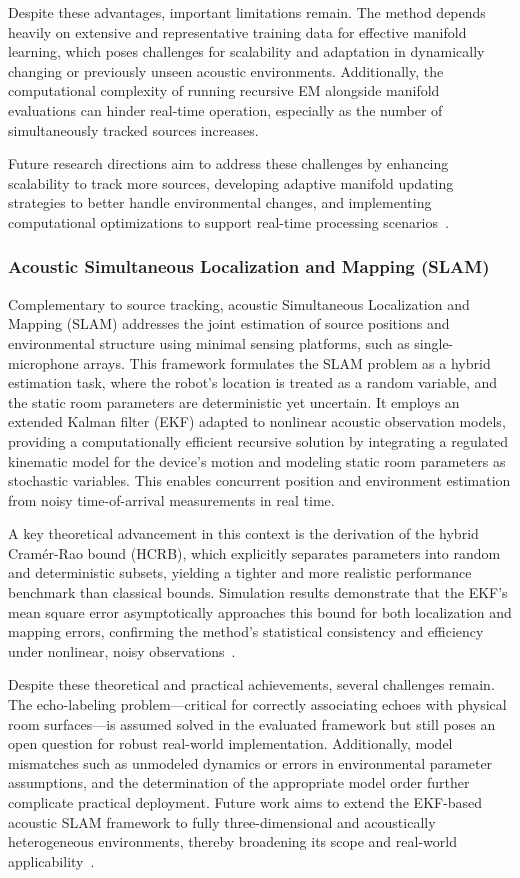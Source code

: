 \documentclass[sigconf]{acmart}
\begin{document}
Despite these advantages, important limitations remain. The method depends heavily on extensive and representative training data for effective manifold learning, which poses challenges for scalability and adaptation in dynamically changing or previously unseen acoustic environments. Additionally, the computational complexity of running recursive EM alongside manifold evaluations can hinder real-time operation, especially as the number of simultaneously tracked sources increases.

Future research directions aim to address these challenges by enhancing scalability to track more sources, developing adaptive manifold updating strategies to better handle environmental changes, and implementing computational optimizations to support real-time processing scenarios~\cite{ref38}.

\subsubsection{Acoustic Simultaneous Localization and Mapping (SLAM)}

Complementary to source tracking, acoustic Simultaneous Localization and Mapping (SLAM) addresses the joint estimation of source positions and environmental structure using minimal sensing platforms, such as single-microphone arrays. This framework formulates the SLAM problem as a hybrid estimation task, where the robot's location is treated as a random variable, and the static room parameters are deterministic yet uncertain. It employs an extended Kalman filter (EKF) adapted to nonlinear acoustic observation models, providing a computationally efficient recursive solution by integrating a regulated kinematic model for the device’s motion and modeling static room parameters as stochastic variables. This enables concurrent position and environment estimation from noisy time-of-arrival measurements in real time.

A key theoretical advancement in this context is the derivation of the hybrid Cramér-Rao bound (HCRB), which explicitly separates parameters into random and deterministic subsets, yielding a tighter and more realistic performance benchmark than classical bounds. Simulation results demonstrate that the EKF's mean square error asymptotically approaches this bound for both localization and mapping errors, confirming the method’s statistical consistency and efficiency under nonlinear, noisy observations~\cite{ref39}.

Despite these theoretical and practical achievements, several challenges remain. The echo-labeling problem—critical for correctly associating echoes with physical room surfaces—is assumed solved in the evaluated framework but still poses an open question for robust real-world implementation. Additionally, model mismatches such as unmodeled dynamics or errors in environmental parameter assumptions, and the determination of the appropriate model order further complicate practical deployment. Future work aims to extend the EKF-based acoustic SLAM framework to fully three-dimensional and acoustically heterogeneous environments, thereby broadening its scope and real-world applicability~\cite{ref39}.
\end{document}
